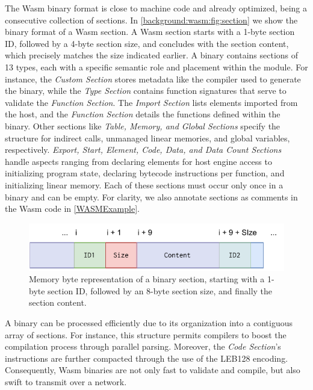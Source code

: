 \label{background:wasm:binary}

The Wasm binary format is close to machine code and already optimized, being a consecutive collection of sections.
In \autoref{background:wasm:fig:section} we show the binary format of a Wasm section.
A Wasm section starts with a 1-byte section ID, followed by a 4-byte section size, and concludes with the section content, which precisely matches the size indicated earlier.
A \Wasm binary contains sections of 13 types, each with a specific semantic role and placement within the module. 
For instance, the \emph{Custom Section} stores metadata like the compiler used to generate the binary, while the \emph{Type Section} contains function signatures that serve to validate the \emph{Function Section}. 
The \emph{Import Section} lists elements imported from the host, and the \emph{Function Section} details the functions defined within the binary. 
Other sections like \emph{Table, Memory, and Global Sections} specify the structure for indirect calls, unmanaged linear memories, and global variables, respectively. 
\emph{Export, Start, Element, Code, Data, and Data Count Sections} handle aspects ranging from declaring elements for host engine access to initializing program state, declaring bytecode instructions per function, and initializing linear memory. 
Each of these sections must occur only once in a binary and can be empty.
For clarity, we also annotate sections as comments in the Wasm code in \autoref{WASMExample}.
    

\begin{figure}[h]
    \centering
    \includegraphics[width=0.5\linewidth]{figures/section.pdf}
    \caption{Memory byte representation of a \Wasm binary section, starting with a 1-byte section ID, followed by an 8-byte section size, and finally the section content.}
    \label{background:wasm:fig:section}
\end{figure}

A \Wasm binary can be processed efficiently due to its organization into a contiguous array of sections. 
For instance, this structure permits compilers to boost the compilation process through parallel parsing. 
Moreover, the \emph{Code Section}'s instructions are further compacted through the use of the LEB128 encoding. 
Consequently, Wasm binaries are not only fast to validate and compile, but also swift to transmit over a network.

